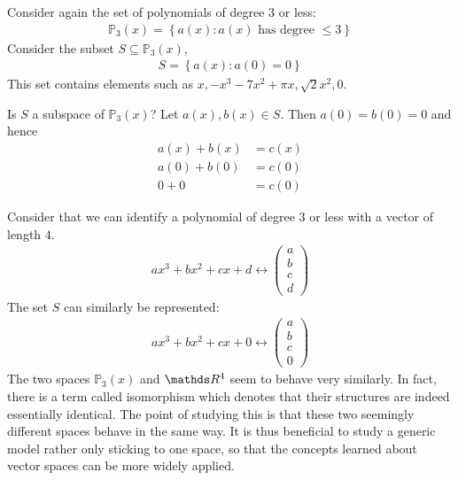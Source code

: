\documentclass[11pt]{article}
\begin{document}
\vspace{1cm}
Consider again the set of polynomials of degree $3$ or less:
\begin{align*}
\mathbb{P}_3(x) = \left\{ a(x) : \text{$a(x)$ has degree $\le 3$} \right\}
\end{align*}
Consider the subset $S \subseteq \mathbb{P}_3(x)$,
\begin{align*}
S = \left\{ a(x) : a(0) = 0 \right\}
\end{align*}
This set contains elements such as $x, -x^3 - 7x^2 + \pi x, \sqrt{2} x^2, 0$.

Is $S$ a subspace of $\mathbb{P}_3(x)$? Let $a(x), b(x) \in S$. Then $a(0) = b(0) = 0$ and hence
\begin{align*}
a(x) + b(x) &= c(x)
\\
a(0) + b(0) &= c(0)
\\
0 + 0 &= c(0)
\end{align*}

Consider that we can identify a polynomial of degree $3$ or less with a vector of length $4$.
\begin{align*}
a x^3 + b x^2 + cx + d
\longleftrightarrow
\begin{pmatrix}a \\ b \\ c \\ d\end{pmatrix}
\end{align*}
The set $S$ can similarly be represented:
\begin{align*}
a x^3 + b x^2 + c x + 0
\longleftrightarrow
\begin{pmatrix}a \\ b \\ c \\ 0\end{pmatrix}
\end{align*}
The two spaces $\mathbb{P}_3(x)$ and $\bbR^4$ seem to behave very similarly. In fact, there is a term called isomorphism which denotes that their structures are indeed essentially identical. The point of studying this is that these two seemingly different spaces behave in the same way. It is thus beneficial to study a generic model rather only sticking to one space, so that the concepts learned about vector spaces can be more widely applied.
\end{document}
